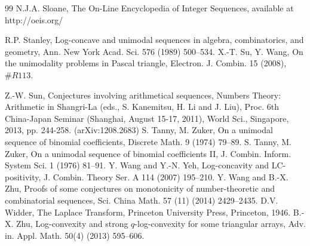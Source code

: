\documentclass[12pt,reqno]{article}
\theoremstyle{definition}
\numberwithin{equation}{section}
\begin{document}
\begin{thebibliography}{99}
N.J.A. Sloane, The On-Line Encyclopedia of Integer Sequences,
available at http://oeis.org/

R.P. Stanley, Log-concave and unimodal sequences in algebra,
combinatorics, and geometry, Ann. New York Acad. Sci. 576 (1989)
500--534.
X.-T. Su, Y. Wang, On the unimodality problems in Pascal triangle,
Electron. J. Combin. 15 (2008), $\#R113$.

Z.-W. Sun, Conjectures involving arithmetical sequences, Numbers
Theory: Arithmetic in Shangri-La (eds., S. Kanemitsu, H. Li and J.
Liu), Proc. 6th China-Japan Seminar (Shanghai, August 15-17, 2011),
World Sci., Singapore, 2013, pp. 244-258. (arXiv:1208.2683)
S. Tanny, M. Zuker, On a unimodal sequence of binomial coefficients,
Discrete Math. 9 (1974) 79--89.
S. Tanny, M. Zuker, On a unimodal sequence of binomial coefficients
II, J. Combin. Inform. System Sci. 1 (1976) 81--91.
Y. Wang and Y.-N. Yeh, Log-concavity and LC-positivity, J. Combin.
Theory Ser. A 114 (2007) 195--210.
Y. Wang and B.-X. Zhu, Proofs of some conjectures on monotonicity of
number-theoretic and combinatorial sequences, Sci. China Math. 57
(11) (2014) 2429--2435.
D.V. Widder, The Laplace Transform, Princeton University Press,
Princeton, 1946.
B.-X. Zhu, Log-convexity and strong $q$-log-convexity for some
triangular arrays, Adv. in. Appl. Math. 50(4) (2013) 595--606.
\end{thebibliography}
\end{document}
